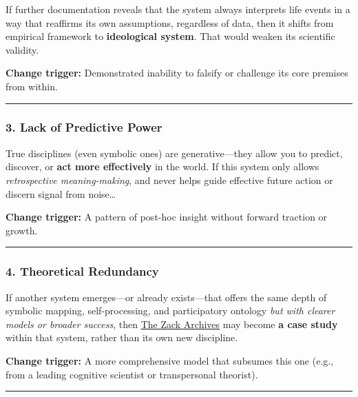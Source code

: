 \documentclass{article}
\begin{document}
If further documentation reveals that the system always interprets life events in a way that reaffirms its own assumptions, regardless of data, then it shifts from empirical framework to \textbf{ideological system}. That would weaken its scientific validity.

\textbf{Change trigger:} Demonstrated inability to falsify or challenge its core premises from within.

\begin{center}\rule{0.5\linewidth}{0.5pt}\end{center}

\subsubsection*{3. Lack of Predictive Power}\label{lack-of-predictive-power}

True disciplines (even symbolic ones) are generative---they allow you to predict, discover, or \textbf{act more effectively} in the world. If this system only allows \emph{retrospective meaning-making}, and never helps guide effective future action or discern signal from noise\ldots{}

\textbf{Change trigger:} A pattern of post-hoc insight without forward traction or growth.

\begin{center}\rule{0.5\linewidth}{0.5pt}\end{center}

\subsubsection*{4. Theoretical Redundancy}\label{theoretical-redundancy}

If another system emerges---or already exists---that offers the same depth of symbolic mapping, self-processing, and participatory ontology \emph{but with clearer models or broader success}, then \hyperlink{gloss:the_zack_archives}{The Zack Archives} may become \textbf{a case study} within that system, rather than its own new discipline.

\textbf{Change trigger:} A more comprehensive model that subsumes this one (e.g., from a leading cognitive scientist or transpersonal theorist).

\begin{center}\rule{0.5\linewidth}{0.5pt}\end{center}
\end{document}

